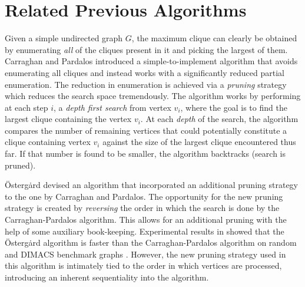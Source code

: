 \section{Related Previous Algorithms}
\label{sec:relatedwork}

Given a simple undirected graph $G$, the maximum clique can clearly be obtained by enumerating 
{\em all} of the cliques present in it and picking the largest of them.
Carraghan and Pardalos \cite{pardalos} introduced a simple-to-implement
algorithm that avoids enumerating all cliques and instead
works with a significantly reduced partial enumeration.
The reduction in enumeration is achieved via 
a {\em pruning} strategy which reduces the search space tremendously.
The algorithm works by
performing at each step $i$, a {\em depth first search} from vertex $v_i$, 
where the goal is to find the largest clique containing the vertex $v_i$.
At each {\em depth} of the search, the algorithm compares the number of remaining
vertices that could potentially constitute a clique containing vertex $v_i$
against the size of the largest clique encountered thus far.
If that number is found to be smaller, the algorithm backtracks (search is pruned).

\"{O}sterg\.{a}rd \cite{ostergard} devised an algorithm that incorporated an additional 
pruning strategy to the one by Carraghan and Pardalos.
The opportunity for the new pruning strategy is created by {\em reversing} the order in which the search is done by
the Carraghan-Pardalos algorithm. This allows for an additional pruning with the help of
some auxiliary book-keeping. 
Experimental results in \cite{ostergard} showed that the \"{O}sterg\.{a}rd
algorithm is faster than the Carraghan-Pardalos algorithm on random and 
DIMACS benchmark graphs \cite{dimacs}.
However, the new pruning strategy used in this algorithm is intimately tied to the order in which vertices are processed, introducing an inherent sequentiality into the algorithm.

